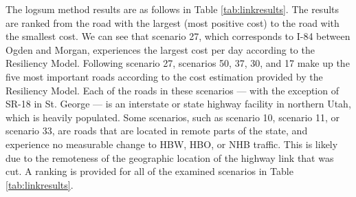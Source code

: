 The logsum method results are as follows in Table \ref{tab:linkresults}.
The results are ranked from the road with the largest (most positive
cost) to the road with the smallest cost. We can see that scenario 27, which
corresponds to I-84 between Ogden and Morgan, experiences the largest cost
per day according to the Resiliency Model. Following scenario 27, scenarios 50, 37, 30,
and 17 make up the five most important roads according to the cost estimation
provided by the Resiliency Model. Each of the roads in these scenarios --- with the exception
of SR-18 in St. George --- is an interstate or state highway facility in
northern Utah, which is heavily populated. Some scenarios, such as scenario 10,
scenario 11, or scenario 33, are roads that are located in remote parts of the state, and
experience no measurable change to HBW, HBO, or NHB traffic. This is
likely due to the remoteness of the geographic location of the highway
link that was cut. A ranking is provided for all of the examined scenarios in Table \ref{tab:linkresults}.

